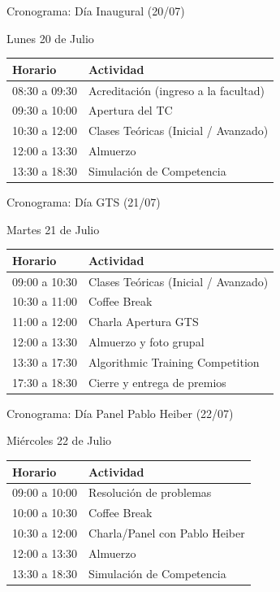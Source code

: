 \documentclass{beamer}
\begin{document}
\begin{frame}{Cronograma: Día Inaugural (20/07)}
    \begin{block}{Lunes 20 de Julio}
        \centering
        \begin{tabular}{|l|l|}
            \hline
            \textbf{Horario} & \textbf{Actividad} \\
            \hline
            08:30 a 09:30 & Acreditación (ingreso a la facultad) \\
            09:30 a 10:00 & Apertura del TC \\
            10:30 a 12:00 & Clases Teóricas (Inicial / Avanzado) \\
            12:00 a 13:30 & Almuerzo \\
            13:30 a 18:30 & Simulación de Competencia \\
            \hline
        \end{tabular}
    \end{block}
\end{frame}

\begin{frame}{Cronograma: Día GTS (21/07)}
    \begin{block}{Martes 21 de Julio}
        \centering
        \small
        \begin{tabular}{|l|l|}
            \hline
            \textbf{Horario} & \textbf{Actividad} \\
            \hline
            09:00 a 10:30 & Clases Teóricas (Inicial / Avanzado) \\
            10:30 a 11:00 & Coffee Break \\
            11:00 a 12:00 & Charla Apertura GTS \\
            12:00 a 13:30 & Almuerzo y foto grupal \\
            13:30 a 17:30 & Algorithmic Training Competition \\
            17:30 a 18:30 & Cierre y entrega de premios \\
            \hline
        \end{tabular}
    \end{block}
\end{frame}

\begin{frame}{Cronograma: Día Panel Pablo Heiber (22/07)}
    \begin{block}{Miércoles 22 de Julio}
        \centering
        \begin{tabular}{|l|l|}
            \hline
            \textbf{Horario} & \textbf{Actividad} \\
            \hline
            09:00 a 10:00 & Resolución de problemas \\
            10:00 a 10:30 & Coffee Break \\
            10:30 a 12:00 & Charla/Panel con Pablo Heiber \\
            12:00 a 13:30 & Almuerzo \\
            13:30 a 18:30 & Simulación de Competencia \\
            \hline
        \end{tabular}
    \end{block}
\end{frame}
\end{document}
